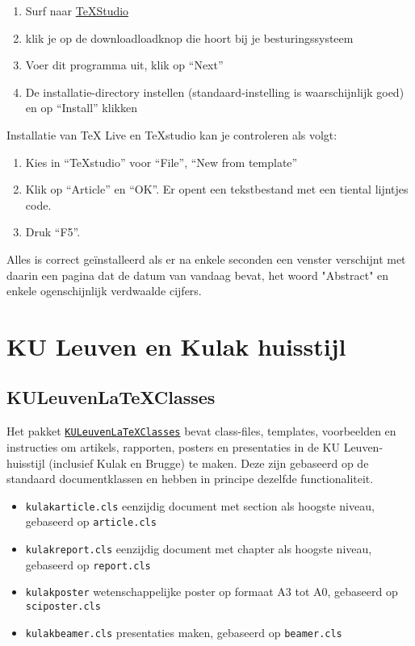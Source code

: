 \documentclass[kulak]{kulakarticle} %
\begin{document}
\begin{enumerate}
\item Surf naar  \href{http://texstudio.sourceforge.net/}{TeXStudio}
\item klik je op de downloadloadknop die hoort bij je besturingssysteem
\item Voer dit programma uit, klik op ``Next''
\item De installatie-directory instellen (standaard-instelling is waarschijnlijk goed) en op ``Install'' klikken
\end{enumerate}
Installatie van TeX Live en TeXstudio kan je controleren als volgt:
\begin{enumerate}
\item Kies in ``TeXstudio'' voor ``File'', ``New from template''
\item Klik op ``Article'' en ``OK''. Er opent een tekstbestand met een tiental lijntjes code.
\item Druk ``F5''.
\end{enumerate}
Alles is correct geïnstalleerd als er na enkele seconden een venster verschijnt met daarin een pagina dat de datum van vandaag bevat, het woord "Abstract" en enkele ogenschijnlijk verdwaalde cijfers.

\section{KU Leuven en Kulak huisstijl}
\label{sec:huisstijl}
\subsection{KULeuvenLaTeXClasses}
Het pakket \href{https://github.com/srebry/KULeuvenLaTeXClasses}{\texttt{KULeuvenLaTeXClasses}} bevat class-files, templates, voorbeelden en instructies om artikels, rapporten, posters en presentaties in de KU Leuven-huisstijl (inclusief Kulak en Brugge) te maken. Deze zijn gebaseerd op de standaard documentklassen en hebben in principe dezelfde functionaliteit.
\begin{itemize}
\item \texttt{kulakarticle.cls} eenzijdig document met section als hoogste niveau, gebaseerd op \texttt{article.cls}
\item \texttt{kulakreport.cls} eenzijdig document met chapter als hoogste niveau, gebaseerd op \texttt{report.cls}
\item \texttt{kulakposter} wetenschappelijke poster op formaat A3 tot A0, gebaseerd op \texttt{sciposter.cls}
\item \texttt{kulakbeamer.cls} presentaties maken, gebaseerd op \texttt{beamer.cls}
\end{itemize}
\end{document}
